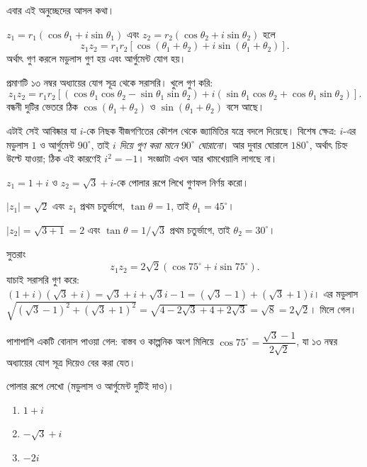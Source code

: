 \documentclass[11pt]{article}
\begin{document}
এবার এই অনুচ্ছেদের আসল কথা।

\begin{idea}[গুণ মানে ঘূর্ণন ও প্রসারণ]
$z_{1} = r_{1}\left( \cos\theta_{1} + i\sin\theta_{1} \right)$ এবং
$z_{2} = r_{2}\left( \cos\theta_{2} + i\sin\theta_{2} \right)$ হলে
\[
  z_{1}z_{2} = r_{1}r_{2}\left[ \cos(\theta_{1}+\theta_{2})
  + i\sin(\theta_{1}+\theta_{2}) \right] .
\]
অর্থাৎ গুণ করলে মডুলাস গুণ হয় এবং আর্গুমেন্ট যোগ হয়।
\end{idea}

প্রমাণটি ১৩ নম্বর অধ্যায়ের যোগ সূত্র থেকে সরাসরি। খুলে গুণ করি:
\[
  z_{1}z_{2} = r_{1}r_{2}\left[
  \left( \cos\theta_{1}\cos\theta_{2} - \sin\theta_{1}\sin\theta_{2} \right)
  + i\left( \sin\theta_{1}\cos\theta_{2} + \cos\theta_{1}\sin\theta_{2} \right)
  \right] .
\]
বন্ধনী দুটির ভেতরে ঠিক $\cos(\theta_{1}+\theta_{2})$ ও
$\sin(\theta_{1}+\theta_{2})$ বসে আছে।

এটাই সেই আবিষ্কার যা $i$-কে নিছক বীজগণিতের কৌশল থেকে জ্যামিতির যন্ত্রে বদলে
দিয়েছে। বিশেষ ক্ষেত্র: $i$-এর মডুলাস $1$ ও আর্গুমেন্ট $90^{\circ}$, তাই
\emph{$i$ দিয়ে গুণ করা মানে $90^{\circ}$ ঘোরানো}। আর দুবার ঘোরালে
$180^{\circ}$, অর্থাৎ চিহ্ন উল্টে যাওয়া; ঠিক এই কারণেই $i^{2} = -1$।
সংজ্ঞাটা এখন আর খামখেয়ালি লাগছে না।

\begin{example}
$z_{1} = 1+i$ ও $z_{2} = \sqrt{3}+i$-কে পোলার রূপে লিখে গুণফল নির্ণয় করো।
\end{example}

\begin{solbox}
$|z_{1}| = \sqrt{2}$ এবং $z_{1}$ প্রথম চতুর্ভাগে, $\tan\theta = 1$, তাই
$\theta_{1} = 45^{\circ}$।

$|z_{2}| = \sqrt{3+1} = 2$ এবং $\tan\theta = 1/\sqrt{3}$ প্রথম চতুর্ভাগে, তাই
$\theta_{2} = 30^{\circ}$।

সুতরাং
\[
  z_{1}z_{2} = 2\sqrt{2}\left( \cos 75^{\circ} + i\sin 75^{\circ} \right) .
\]
যাচাই সরাসরি গুণ করে: $(1+i)(\sqrt{3}+i) = \sqrt{3} + i + \sqrt{3}i - 1
= (\sqrt{3}-1) + (\sqrt{3}+1)i$। এর মডুলাস
$\sqrt{(\sqrt{3}-1)^{2}+(\sqrt{3}+1)^{2}} = \sqrt{4-2\sqrt{3}+4+2\sqrt{3}}
= \sqrt{8} = 2\sqrt{2}$। মিলে গেল।

পাশাপাশি একটি বোনাস পাওয়া গেল: বাস্তব ও কাল্পনিক অংশ মিলিয়ে
$\cos 75^{\circ} = \dfrac{\sqrt{3}-1}{2\sqrt{2}}$, যা ১৩ নম্বর অধ্যায়ের
যোগ সূত্র দিয়েও বের করা যেত।
\end{solbox}

 পোলার রূপে লেখো (মডুলাস ও আর্গুমেন্ট দুটিই দাও)।
\begin{enumerate}
  \item $1+i$
  \item $-\sqrt{3}+i$
  \item $-2i$
\end{enumerate}
\end{document}
